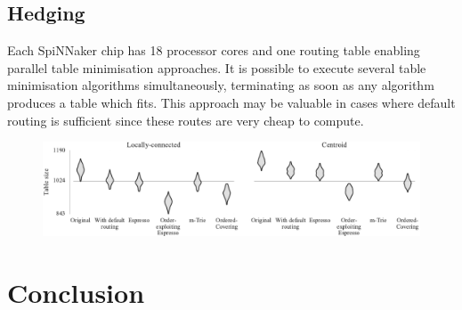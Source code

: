 \documentclass[conference]{IEEEtran}
\begin{document}
    \subsection{Hedging}
    
       Each SpiNNaker chip has 18 processor cores and one routing table enabling parallel table minimisation approaches.
       It is possible to execute several table minimisation algorithms simultaneously, terminating as soon as any algorithm produces a table which fits.
       This approach may be valuable in cases where default routing is sufficient since these routes are very cheap to compute.

\begin{figure}
  \centering
  \includegraphics{experiments/results_esp_and_oc}
\end{figure}

  \section{Conclusion}

\printbibliography
\end{document}
